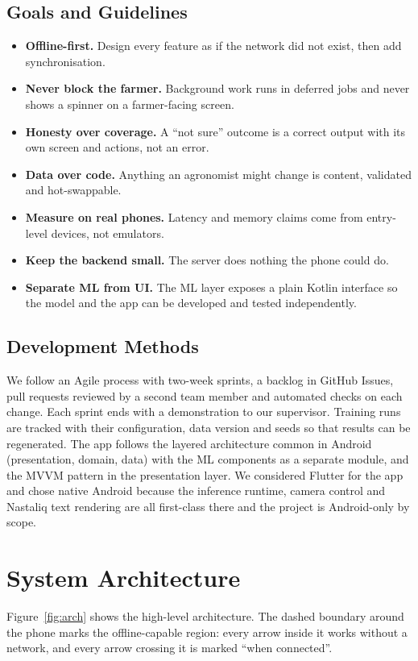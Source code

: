 \subsection{Goals and Guidelines}
\begin{itemize}
  \item \textbf{Offline-first.} Design every feature as if the network did not exist, then add synchronisation.
  \item \textbf{Never block the farmer.} Background work runs in deferred jobs and never shows a spinner on a farmer-facing screen.
  \item \textbf{Honesty over coverage.} A ``not sure'' outcome is a correct output with its own screen and actions, not an error.
  \item \textbf{Data over code.} Anything an agronomist might change is content, validated and hot-swappable.
  \item \textbf{Measure on real phones.} Latency and memory claims come from entry-level devices, not emulators.
  \item \textbf{Keep the backend small.} The server does nothing the phone could do.
  \item \textbf{Separate ML from UI.} The ML layer exposes a plain Kotlin interface so the model and the app can be developed and tested independently.
\end{itemize}

\subsection{Development Methods}
We follow an Agile process with two-week sprints, a backlog in GitHub Issues, pull requests reviewed by a second team member and automated checks on each change. Each sprint ends with a demonstration to our supervisor. Training runs are tracked with their configuration, data version and seeds so that results can be regenerated. The app follows the layered architecture common in Android (presentation, domain, data) with the ML components as a separate module, and the MVVM pattern in the presentation layer. We considered Flutter for the app and chose native Android because the inference runtime, camera control and Nastaliq text rendering are all first-class there and the project is Android-only by scope.

\section{System Architecture}
Figure~\ref{fig:arch} shows the high-level architecture. The dashed boundary around the phone marks the offline-capable region: every arrow inside it works without a network, and every arrow crossing it is marked ``when connected''.

